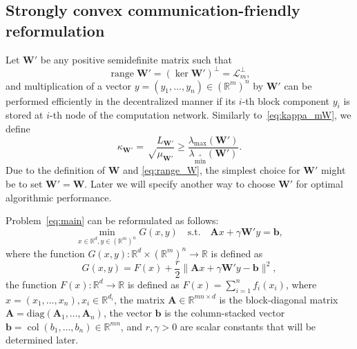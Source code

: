 \documentclass{article}
\DeclareMathOperator{\range}{\mathrm{range}}
\DeclareMathOperator{\col}{\mathrm{col}}
\newcommand{\lmax}{\lambda_{\max}}
\newcommand{\lminp}{\lambda_{\min^+}}
\newcommand{\R}{\mathbb{R}}
\newcommand{\norm}[1]{\|#1\|}
\newcommand{\sqn}[1]{\norm{#1}^2}
\newcommand{\diag}[1]{\mathrm{diag}\left(#1\right)}
\newcommand{\sX}{\R^d}
\newcommand{\sY}{\R^m}
\newcommand{\cL}{\mathcal{L}}
\newcommand{\mA}{\mathbf{A}}
\newcommand{\mW}{\mathbf{W}}
\newcommand{\pW}{\mathbf{W'}}
\newcommand{\mb}{\mathbf{b}}
\newcommand{\cbraces}[1]{\left( #1 \right)}
\begin{document}
\subsection{Strongly convex communication-friendly reformulation}
Let $\pW$ be any positive semidefinite matrix such that 
\begin{equation}\label{eq:range_pW}
  \range \pW = (\ker \pW)^\perp =  \cL_m^\perp,
\end{equation}
and multiplication of a vector $y = (y_1, \ldots, y_n) \in (\sY)^n$ by $\pW$ can be performed efficiently in the decentralized manner if its $i$-th block component $y_i$ is stored at $i$-th node of the computation network.
Similarly to~\cref{eq:kappa_mW}, we define
\begin{equation}\label{eq:kappa_pW}
    \kappa_{\pW} = \sqrt\frac{L_{\pW}}{\mu_{\pW}} \geq \frac{\lmax(\pW)}{\lminp(\pW)}.
\end{equation}
Due to the definition of $\mW$ and \cref{eq:range_W}, the simplest choice for $\pW$ might be to set $\pW = \mW$. 
Later we will specify another way to choose $\pW$ for optimal algorithmic performance.

Problem~\eqref{eq:main} can be reformulated as follows:
\begin{equation}\label{eq:lifted}
	\min_{x\in \sX, y \in (\sY)^n} G(x,y) \quad\text{s.t.}\quad \mA x + \gamma \pW y = \mb,
\end{equation}
where the function $G(x,y) \colon \sX \times (\sY)^n \to \R$ is defined as
\begin{equation}\label{eq:G}
	G(x,y) = F(x) + \frac{r}{2}\sqn{\mA x + \gamma \pW y - \mb},
\end{equation}
the function $F(x) \colon \sX \to \R$ is defined as
$F(x) = \sum_{i=1}^{n} f_i(x_i)$, where $x=(x_1,\ldots,x_n), x_i \in \R^{d_i}$,
the matrix $\mA \in \R^{mn \times d}$ is the block-diagonal matrix $\mA = \diag{\mA_1, \ldots,\mA_n}$,
the vector $\mb$ is the column-stacked vector $\mb = \col\cbraces{b_1,\ldots,b_n} \in \R^{mn}$,
and $r, \gamma > 0$ are scalar constants that will be determined later.
\end{document}
